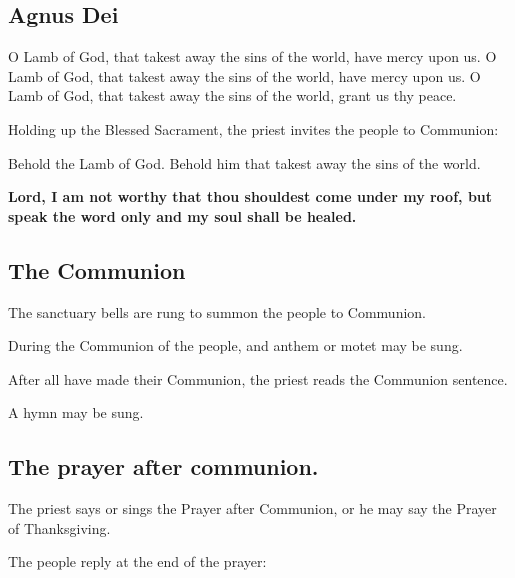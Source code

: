 
\subsection{Agnus Dei}

O Lamb of God, that takest away the sins of the world, have mercy upon us.
O Lamb of God, that takest away the sins of the world, have mercy upon us.
O Lamb of God, that takest away the sins of the world, grant us thy peace.

\begin{rubric}
Holding up the Blessed Sacrament, the priest invites the people to Communion:
\end{rubric}

Behold the Lamb of God. Behold him that takest away the sins of the world.

\textbf{Lord, I am not worthy that thou shouldest come under my roof, but
speak the word only and my soul shall be healed.}

\subsection{The Communion}

\begin{rubric}
The sanctuary bells are rung to summon the people to Communion.

During the Communion of the people, and anthem or motet may be sung.

After all have made their Communion, the priest reads the Communion sentence.

A hymn may be sung.
\end{rubric}

\subsection{The prayer after communion.}

\begin{rubric}
The priest says or sings the Prayer after Communion, or he may say the Prayer of Thanksgiving.
\end{rubric}



\begin{rubric}
The people reply at the end of the prayer: 
\end{rubric}

